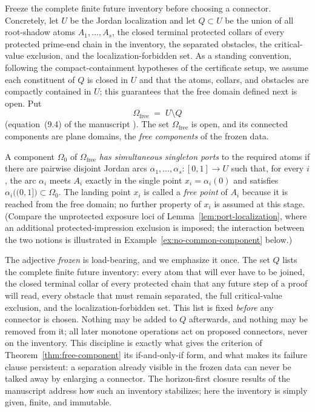 \documentclass[11pt,reqno]{amsart}
\theoremstyle{definition}
\theoremstyle{remark}
\newcommand{\Omfree}{\Omega_{\mathrm{free}}}
\begin{document}
Freeze the complete finite future inventory before choosing a connector. Concretely, let
$U$ be the Jordan localization and let $Q\subset U$ be the union of
all root-shadow atoms $A_1,\dots,A_s$, the closed terminal protected collars of every
protected prime-end chain in the inventory, the separated obstacles, the critical-value
exclusion, and the localization-forbidden set. As a standing convention, following the
compact-containment hypotheses of the certificate setup, we assume each constituent of
$Q$ is closed in $U$ and that the atoms, collars, and obstacles are compactly contained
in $U$; this guarantees that the free domain defined next is open. Put
\begin{equation}\label{eq:D-free-domain}
\Omfree \;=\; U\setminus Q
\end{equation}
(equation~(9.4) of the manuscript \cite{MWman}). The set $\Omfree$ is open, and its
connected components are plane domains, the \emph{free components} of the frozen data.

A component $\Omega_0$ of $\Omfree$ \emph{has simultaneous singleton ports} to the
required atoms if there are pairwise disjoint Jordan arcs
$\alpha_1,\dots,\alpha_s\colon[0,1]\to U$ such that, for every $i$, the arc $\alpha_i$
meets $A_i$ exactly in the single point $x_i=\alpha_i(0)$ and satisfies
$\alpha_i\bigl((0,1]\bigr)\subset\Omega_0$. The landing point $x_i$ is called a
\emph{free point} of $A_i$ because it is reached from the free domain; no further
property of $x_i$ is assumed at this stage. (Compare the unprotected exposure loci of
Lemma~\ref{lem:port-localization}, where an additional protected-impression exclusion is
imposed; the interaction between the two notions is illustrated in
Example~\ref{ex:no-common-component} below.)

The adjective \emph{frozen} is load-bearing, and we emphasize it once. The set $Q$ lists
the complete finite future inventory: every atom that will ever have to be joined, the
closed terminal collar of every protected chain that any future step of a proof will
read, every obstacle that must remain separated, the full critical-value exclusion, and
the localization-forbidden set. This list is fixed \emph{before} any connector is chosen.
Nothing may be added to $Q$ afterwards, and nothing may be removed from it; all later
monotone operations act on proposed connectors, never on the inventory. This discipline
is exactly what gives the criterion of Theorem~\ref{thm:free-component} its
if-and-only-if form, and what makes its failure clause persistent: a separation already
visible in the frozen data can never be talked away by enlarging a connector. The
horizon-first closure results of the manuscript \cite{MWman} address how such an
inventory stabilizes; here the inventory is simply given, finite, and immutable.
\end{document}
